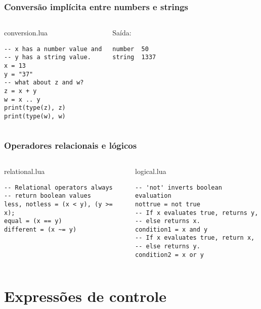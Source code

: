 \documentclass[brazil]{beamer}
\begin{document}
\begin{frame}[fragile]
  \frametitle{Conversão implícita entre numbers e strings}
  \pause
  \begin{columns}
      \begin{block}{conversion.lua}
        \begin{lstlisting}
-- x has a number value and
-- y has a string value.
x = 13
y = "37"
-- what about z and w?
z = x + y
w = x .. y
print(type(z), z)
print(type(w), w)
        \end{lstlisting}
      \end{block}
    \pause
      \begin{block}{Saída:}
        \begin{verbatim}
number  50
string  1337  \end{verbatim}
      \end{block}
  \end{columns}
\end{frame}
\begin{frame}[fragile]
  \frametitle{Operadores relacionais e lógicos}
  \pause
  \begin{columns}
      \begin{block}{relational.lua}
        \begin{lstlisting}
-- Relational operators always
-- return boolean values
less, notless = (x < y), (y >= x);
equal = (x == y)
different = (x ~= y)
        \end{lstlisting}
      \end{block}
    \pause
      \begin{block}{logical.lua}
        \begin{lstlisting}
-- 'not' inverts boolean evaluation
nottrue = not true
-- If x evaluates true, returns y,
-- else returns x.
condition1 = x and y
-- If x evaluates true, return x,
-- else returns y.
condition2 = x or y
        \end{lstlisting}
      \end{block}
  \end{columns}
\end{frame}
\section{Expressões de controle}
\end{document}
